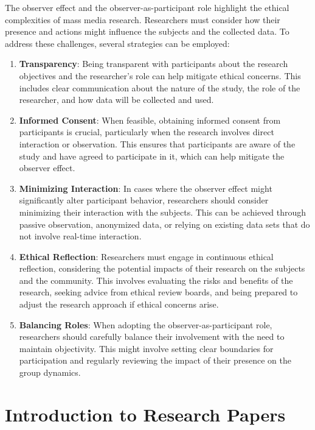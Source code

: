 \documentclass[
]{book}
\begin{document}
The observer effect and the observer-as-participant role highlight the ethical complexities of mass media research. Researchers must consider how their presence and actions might influence the subjects and the collected data. To address these challenges, several strategies can be employed:

\begin{enumerate}
\def\labelenumi{\arabic{enumi}.}
\item
  \textbf{Transparency}: Being transparent with participants about the research objectives and the researcher's role can help mitigate ethical concerns. This includes clear communication about the nature of the study, the role of the researcher, and how data will be collected and used.
\item
  \textbf{Informed Consent}: When feasible, obtaining informed consent from participants is crucial, particularly when the research involves direct interaction or observation. This ensures that participants are aware of the study and have agreed to participate in it, which can help mitigate the observer effect.
\item
  \textbf{Minimizing Interaction}: In cases where the observer effect might significantly alter participant behavior, researchers should consider minimizing their interaction with the subjects. This can be achieved through passive observation, anonymized data, or relying on existing data sets that do not involve real-time interaction.
\item
  \textbf{Ethical Reflection}: Researchers must engage in continuous ethical reflection, considering the potential impacts of their research on the subjects and the community. This involves evaluating the risks and benefits of the research, seeking advice from ethical review boards, and being prepared to adjust the research approach if ethical concerns arise.
\item
  \textbf{Balancing Roles}: When adopting the observer-as-participant role, researchers should carefully balance their involvement with the need to maintain objectivity. This might involve setting clear boundaries for participation and regularly reviewing the impact of their presence on the group dynamics.
\end{enumerate}

\chapter{Introduction to Research Papers}\label{introduction-to-research-papers}
\end{document}
